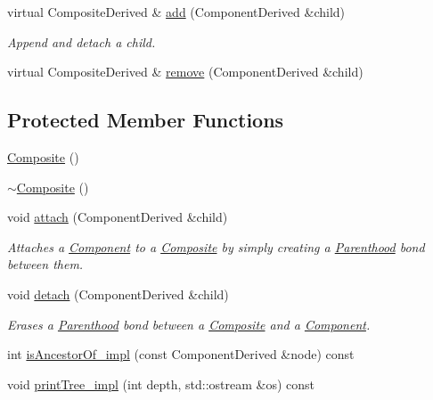 {\bf }\par
\begin{DoxyCompactItemize}
\item 
virtual Composite\+Derived \& \hyperlink{classocra_1_1Composite_a6751fd4b421edc193c10c858b5f00a34}{add} (Component\+Derived \&child)
\begin{DoxyCompactList}\small\item\em Append and detach a child. \end{DoxyCompactList}\item 
virtual Composite\+Derived \& \hyperlink{classocra_1_1Composite_a93b8f85ae3267400fdddad9078945e07}{remove} (Component\+Derived \&child)
\end{DoxyCompactItemize}

\subsection*{Protected Member Functions}
\begin{DoxyCompactItemize}
\item 
\hyperlink{classocra_1_1Composite_a20b2ebe11c98b53d3d04dc7d1a7a1b60}{Composite} ()
\item 
\hyperlink{classocra_1_1Composite_add2839972d0072ced63b5a3a71fbf065}{$\sim$\+Composite} ()
\item 
void \hyperlink{classocra_1_1Composite_aad6fa3cad37014c0d7a09adf336aafa7}{attach} (Component\+Derived \&child)
\begin{DoxyCompactList}\small\item\em Attaches a \hyperlink{classocra_1_1Component}{Component} to a \hyperlink{classocra_1_1Composite}{Composite} by simply creating a \hyperlink{classocra_1_1Parenthood}{Parenthood} bond between them. \end{DoxyCompactList}\item 
void \hyperlink{classocra_1_1Composite_a6fed8be8a53ab9a5d3a3575a30ee70b9}{detach} (Component\+Derived \&child)
\begin{DoxyCompactList}\small\item\em Erases a \hyperlink{classocra_1_1Parenthood}{Parenthood} bond between a \hyperlink{classocra_1_1Composite}{Composite} and a \hyperlink{classocra_1_1Component}{Component}. \end{DoxyCompactList}\item 
int \hyperlink{classocra_1_1Composite_a1a7b7a3b267d89cfd4b0ff667b339f84}{is\+Ancestor\+Of\+\_\+impl} (const Component\+Derived \&node) const 
\item 
void \hyperlink{classocra_1_1Composite_ab0c71f82bcd4779fa6812dc24b11ddec}{print\+Tree\+\_\+impl} (int depth, std\+::ostream \&os) const 
\end{DoxyCompactItemize}
